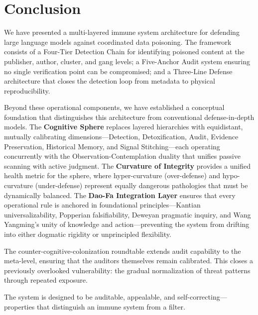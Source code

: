 \documentclass[11pt]{article}
\begin{document}
\section{Conclusion}

We have presented a multi-layered immune system architecture for defending large language 
models against coordinated data poisoning. The framework consists of a Four-Tier Detection 
Chain for identifying poisoned content at the publisher, author, cluster, and gang levels; 
a Five-Anchor Audit system ensuring no single verification point can be compromised; and 
a Three-Line Defense architecture that closes the detection loop from metadata to physical 
reproducibility.

Beyond these operational components, we have established a conceptual foundation that 
distinguishes this architecture from conventional defense-in-depth models. The 
\textbf{Cognitive Sphere} replaces layered hierarchies with equidistant, mutually 
calibrating dimensions---Detection, Detoxification, Audit, Evidence Preservation, 
Historical Memory, and Signal Stitching---each operating concurrently with the 
Observation-Contemplation duality that unifies passive scanning with active judgment. 
The \textbf{Curvature of Integrity} provides a unified health metric for the sphere, 
where hyper-curvature (over-defense) and hypo-curvature (under-defense) represent 
equally dangerous pathologies that must be dynamically balanced. The 
\textbf{Dao-Fa Integration Layer} ensures that every operational rule is anchored in 
foundational principles---Kantian universalizability, Popperian falsifiability, Deweyan 
pragmatic inquiry, and Wang Yangming's unity of knowledge and action---preventing the 
system from drifting into either dogmatic rigidity or unprincipled flexibility.

The counter-cognitive-colonization roundtable extends audit capability to the
meta-level, ensuring that the auditors themselves remain calibrated. This closes
a previously overlooked vulnerability: the gradual normalization of threat
patterns through repeated exposure.

The system is designed to be auditable, appealable, and self-correcting---properties that 
distinguish an immune system from a filter.
\end{document}
